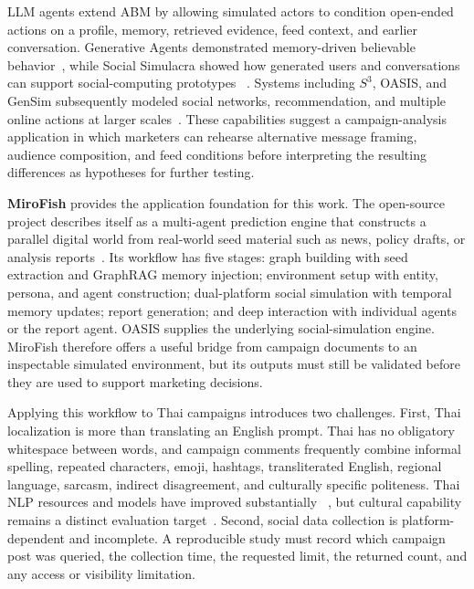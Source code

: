 \documentclass[conference]{IEEEtran}
\begin{document}
LLM agents extend ABM by allowing simulated actors to condition open-ended
actions on a profile, memory, retrieved evidence, feed context, and earlier
conversation. Generative Agents demonstrated memory-driven believable
behavior~\cite{park2023generative}, while Social Simulacra showed how generated
users and conversations can support social-computing prototypes
~\cite{park2022social}. Systems including $S^3$, OASIS, and GenSim subsequently
modeled social networks, recommendation, and multiple online actions at larger
scales~\cite{gao2023s3,yang2024oasis,tang2025gensim}. These capabilities suggest
a campaign-analysis application in which marketers can rehearse alternative
message framing, audience composition, and feed conditions before interpreting
the resulting differences as hypotheses for further testing.

\textbf{MiroFish} provides the application foundation for this work. The
open-source project describes itself as a multi-agent prediction engine that
constructs a parallel digital world from real-world seed material such as
news, policy drafts, or analysis reports~\cite{mirofish2026}. Its workflow has
five stages: graph building with seed extraction and GraphRAG memory injection;
environment setup with entity, persona, and agent construction; dual-platform
social simulation with temporal memory updates; report generation; and deep
interaction with individual agents or the report agent. OASIS supplies the
underlying social-simulation engine. MiroFish therefore offers a useful bridge
from campaign documents to an inspectable simulated environment, but its
outputs must still be validated before they are used to support marketing
decisions.

Applying this workflow to Thai campaigns introduces two challenges. First,
Thai localization is more than translating an English prompt. Thai has no
obligatory whitespace between words, and campaign comments frequently combine
informal spelling, repeated characters, emoji, hashtags, transliterated
English, regional language, sarcasm, indirect disagreement, and culturally
specific politeness. Thai NLP resources and models have improved substantially
~\cite{arreerard2022survey,phatthiyaphaibun2023pythainlp,
lowphansirikul2021wangchanberta,pipatanakul2024typhoon2}, but cultural capability
remains a distinct evaluation target~\cite{kim2025thaicli}. Second, social data
collection is platform-dependent and incomplete. A reproducible study must
record which campaign post was queried, the collection time, the requested
limit, the returned count, and any access or visibility limitation.
\end{document}
